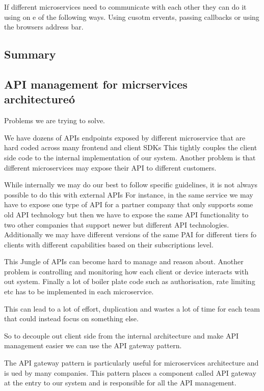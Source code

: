 \documentclass[a4paper, 11pt]{book}
\begin{document}
    If different microservices need to communicate with each other they can do it using on e of the following ways. Using cusotm ervents, passing callbacks or using the browsers address bar.

    \subsection{Summary}

    \subsection{API management for micrservices architectureó}
    Problems we are trying to solve.

    We have dozens of APIs endpoints exposed by different microservice that are hard coded across many frontend and client SDKs
    This tightly couples the client side code to the internal implementation of our system.
    Another problem is that different microservices may expose their API to different customers.

    While internally we may do our best to follow specific guidelines, it is not always possible to do this with external APIs
    For instance, in the same service we may have to expose one type of API for a partner company that only supports some old API technology but then we have to expose the same API functionality to two other companies that support newer but different API technologies.
    Additionally we may have different versions of the same PAI for different tiers fo clients with different capabilities based on their subscriptions level.

    This Jungle of APIs can become hard to manage and reason about.
    Another problem is controlling and monitoring how each client or device interacts with out system.
    Finally a lot of boiler plate code such as authorisation, rate limiting etc has to be implemented in each microservice.

    This can lead to a lot of effort, duplication and wastes a lot of time for each team that could instead focus on something else.

    So to decouple out client side from the internal architecture and make API management easier we can use the API gateway pattern.

    The API gateway pattern is particularly useful for microservices architecture and is ued by many companies.
    This pattern places a component called API gateway at the entry to our system and is responsible for all the API management.
\end{document}
